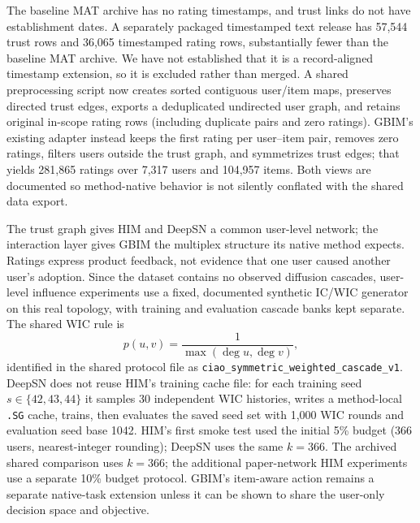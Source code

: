 \documentclass[10pt,twocolumn]{article}
\begin{document}
The baseline MAT archive has no rating timestamps, and trust links do not have establishment dates. A separately packaged timestamped text release has 57,544 trust rows and 36,065 timestamped rating rows, substantially fewer than the baseline MAT archive. We have not established that it is a record-aligned timestamp extension, so it is excluded rather than merged. A shared preprocessing script now creates sorted contiguous user/item maps, preserves directed trust edges, exports a deduplicated undirected user graph, and retains original in-scope rating rows (including duplicate pairs and zero ratings). GBIM's existing adapter instead keeps the first rating per user--item pair, removes zero ratings, filters users outside the trust graph, and symmetrizes trust edges; that yields 281,865 ratings over 7,317 users and 104,957 items. Both views are documented so method-native behavior is not silently conflated with the shared data export.

The trust graph gives HIM and DeepSN a common user-level network; the interaction layer gives GBIM the multiplex structure its native method expects. Ratings express product feedback, not evidence that one user caused another user's adoption. Since the dataset contains no observed diffusion cascades, user-level influence experiments use a fixed, documented synthetic IC/WIC generator on this real topology, with training and evaluation cascade banks kept separate. The shared WIC rule is
\begin{equation}
p(u,v)=\frac{1}{\max(\deg u,\deg v)},
\end{equation}
identified in the shared protocol file as \texttt{ciao\_symmetric\_weighted\_cascade\_v1}. DeepSN does not reuse HIM's training cache file: for each training seed $s\in\{42,43,44\}$ it samples 30 independent WIC histories, writes a method-local \texttt{.SG} cache, trains, then evaluates the saved seed set with 1,000 WIC rounds and evaluation seed base 1042. HIM's first smoke test used the initial 5\% budget (366 users, nearest-integer rounding); DeepSN uses the same $k=366$. The archived shared comparison uses $k=366$; the additional paper-network HIM experiments use a separate 10\% budget protocol. GBIM's item-aware action remains a separate native-task extension unless it can be shown to share the user-only decision space and objective.
\end{document}

